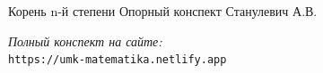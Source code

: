 \documentclass{umk-matematika}
\begin{document}
\maketitlepage
    {Корень n-й степени}
    {Опорный конспект}
    {Станулевич А.В.}

\begin{center}
\vspace{1.5cm}
\textit{Полный конспект на сайте:}\\
\texttt{https://umk-matematika.netlify.app}
\end{center}
\end{document}

